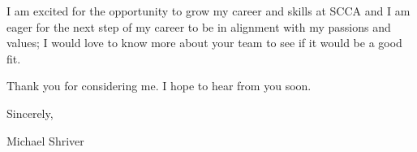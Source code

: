 \documentclass[10pt,oneside]{article}
\begin{document}
\vspace{\baselineskip}

I am excited for the opportunity to grow my career and skills at SCCA and I am eager for the next step of my career to be in alignment with my passions and values; I would love to know more about your team to see if it would be a good fit.

\vspace{\baselineskip}

Thank you for considering me. I hope to hear from you soon.

\vspace{\baselineskip}

Sincerely,

\vspace{\baselineskip}

Michael Shriver
\end{document}
